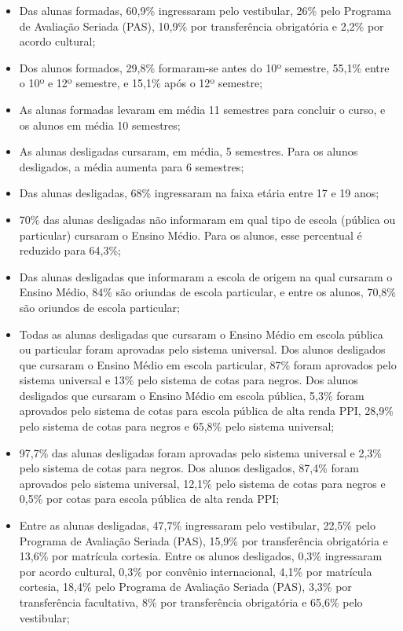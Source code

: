 \begin{itemize}
	\item Das alunas formadas, 60,9\% ingressaram pelo vestibular, 26\% pelo Programa de Avaliação Seriada (PAS), 10,9\% por transferência obrigatória e 2,2\% por acordo cultural;
	
	\item Dos alunos formados, 29,8\% formaram-se antes do 10º semestre, 55,1\% entre o 10º e 12º semestre, e 15,1\% após o 12º semestre; 
	
	\item As alunas formadas levaram em média 11 semestres para concluir o curso, e os alunos em média 10 semestres;
	
	\item As alunas desligadas cursaram, em média, 5 semestres. Para os alunos desligados, a média aumenta para 6 semestres;
	
	\item Das alunas desligadas, 68\% ingressaram na faixa etária entre 17 e 19 anos;
	
	\item 70\% das alunas desligadas não informaram em qual tipo de escola (pública ou particular) cursaram o Ensino Médio. Para os alunos, esse percentual é reduzido para 64,3\%;
	
	\item Das alunas desligadas que informaram a escola de origem na qual cursaram o Ensino Médio, 84\% são oriundas de escola particular, e entre os alunos, 70,8\% são oriundos de escola particular;
	
	\item Todas as alunas desligadas que cursaram o Ensino Médio em escola pública ou particular foram aprovadas pelo sistema universal. Dos alunos desligados que cursaram o Ensino Médio em escola particular, 87\% foram aprovados pelo sistema universal e  13\% pelo sistema de cotas para negros. Dos alunos desligados que cursaram o Ensino Médio em escola pública, 5,3\% foram aprovados pelo sistema de cotas para escola pública de alta renda PPI, 28,9\% pelo sistema de cotas para negros e 65,8\% pelo sistema universal; 
	
	\item 97,7\% das alunas desligadas foram aprovadas pelo sistema universal e 2,3\% pelo sistema de cotas para negros. Dos alunos desligados, 87,4\% foram aprovados pelo sistema universal, 12,1\% pelo sistema de cotas para negros e 0,5\% por cotas para escola pública de alta renda PPI;
	
	\item Entre as alunas desligadas, 47,7\% ingressaram pelo vestibular, 22,5\% pelo Programa de Avaliação Seriada (PAS), 15,9\% por transferência obrigatória e 13,6\% por matrícula cortesia. Entre os alunos desligados, 0,3\% ingressaram por acordo cultural, 0,3\% por convênio internacional, 4,1\% por matrícula cortesia, 18,4\% pelo Programa de Avaliação Seriada (PAS), 3,3\% por transferência facultativa, 8\% por transferência obrigatória e 65,6\% pelo vestibular;
	

\end{itemize}
